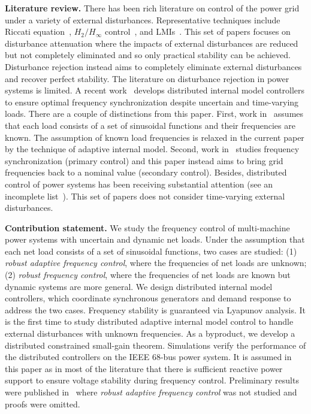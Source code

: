 \documentclass[journal]{IEEEtran}
\begin{document}
\textbf{Literature review.} There has been rich literature on control of the power grid under a variety of external disturbances.
Representative techniques include Riccati equation~\cite{lim1996robust,ray1999new}, $H_2/H_{\infty}$ control~\cite{bevrani2005bilateral,shayeghi2008robust}, and LMIs~\cite{marinovici2013distributed,siljak2002robust}.
This set of papers focuses on disturbance attenuation where the impacts of external disturbances are reduced but not completely eliminated and so only practical stability can be achieved. Disturbance rejection instead aims to completely eliminate external disturbances and recover perfect stability. The literature on disturbance rejection in power systems is limited. A recent work~\cite{trip2016internal} develops distributed internal model controllers to ensure optimal frequency synchronization despite uncertain and time-varying loads. There are a couple of distinctions from this paper. First, work in~\cite{trip2016internal} assumes that each load consists of a set of sinusoidal functions and their frequencies are known. The assumption of known load frequencies is relaxed in the current paper by the technique of adaptive internal model. Second, work in~\cite{trip2016internal} studies frequency synchronization (primary control) and this paper instead aims to bring grid frequencies back to a nominal value (secondary control).
Besides, distributed control of power systems has been receiving substantial attention (see an incomplete list~\cite{simpson2013synchronization,xin2011self,zhang2015real,zhao2014design}). This set of papers does not consider time-varying external disturbances.

\textbf{Contribution statement.} We study the frequency control of multi-machine power systems with uncertain and dynamic net loads.
Under the assumption that each net load consists of a set of sinusoidal functions, two cases are studied:
(1) \emph{robust adaptive frequency control}, where the frequencies of net loads are unknown; (2) \emph{robust frequency control}, where the frequencies of net loads are known but dynamic systems are more general.
We design distributed internal model controllers, which coordinate synchronous generators and demand response to address the two cases. Frequency stability is guaranteed via Lyapunov analysis. It is the first time to study distributed adaptive internal model control to handle external disturbances with unknown frequencies. As a byproduct, we develop a distributed constrained small-gain theorem. Simulations verify the performance of the distributed controllers on the IEEE 68-bus power system.
It is assumed in this paper as in most of the literature that there is sufficient reactive power support to ensure voltage stability during frequency control.
Preliminary results were published in~\cite{HK-MZ:ACC15} where \emph{robust adaptive frequency control} was not studied and proofs were omitted.
\end{document}
